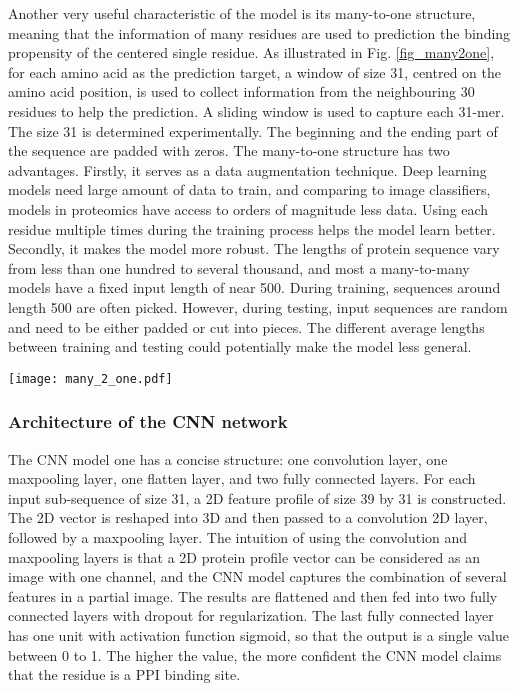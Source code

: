 \documentclass{bioinfo}
\begin{document}
\begin{methods}
Another very useful characteristic of the model is its many-to-one structure, meaning that the information of many residues are used to prediction the binding propensity of the centered single residue. As illustrated in Fig. \ref{fig_many2one}, for each amino acid as the prediction target, a window of size 31, centred on the amino acid position, is used to collect information from the neighbouring 30 residues to help the prediction. A sliding window is used to capture each 31-mer. The size 31 is determined experimentally. The beginning and the ending part of the sequence are padded with zeros. The many-to-one structure has two advantages. Firstly, it serves as a data augmentation technique. Deep learning models need large amount of data to train, and comparing to image classifiers, models in proteomics have access to orders of magnitude less data. Using each residue multiple times during the training process helps the model learn better. Secondly, it makes the model more robust. The lengths of protein sequence vary from less than one hundred to several thousand, and most a many-to-many models have a fixed input length of near 500. During training, sequences around length 500 are often picked. However, during testing, input sequences are random and need to be either padded or cut into pieces. The different average lengths between training and testing could potentially make the model less general. 
\begin{figure*}
\centering
\texttt{[image: many\_2\_one.pdf]}
  \caption{\textbf{The many-to-one prediction.} Sliding windows of size 31, stride 1 are put on top of an input protein sequence. Each time, a sub-sequence of length 31 is extracted. The model predicts the protein-binding propensity of the middle amino acid for each sub-sequence.
  \label{fig_many2one}}
\end{figure*}

\subsubsection{Architecture of the CNN network}
The CNN model one has a concise structure: one convolution layer, one maxpooling layer, one flatten layer, and two fully connected layers. For each input sub-sequence of size 31, a 2D feature profile of size 39 by 31 is constructed. The 2D vector is reshaped into 3D and then passed to a convolution 2D layer, followed by a maxpooling layer. The intuition of using the convolution and maxpooling layers is that a 2D protein profile vector can be considered as an image with one channel, and the CNN model captures the combination of several features in a partial image. The results are flattened and then fed into two fully connected layers with dropout for regularization. The last fully connected layer has one unit with activation function sigmoid, so that the output is a single value between 0 to 1. The higher the value, the more confident the CNN model claims that the residue is a PPI binding site.


\end{methods}
\end{document}
